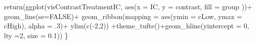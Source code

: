 \documentclass[
  10pt,
  dvipsnames,enabledeprecatedfontcommands]{scrartcl}
\newenvironment{Shaded}{\begin{snugshade}}{\end{snugshade}}
\newcommand{\AttributeTok}[1]{\textcolor[rgb]{0.77,0.63,0.00}{#1}}
\newcommand{\ConstantTok}[1]{\textcolor[rgb]{0.00,0.00,0.00}{#1}}
\newcommand{\DecValTok}[1]{\textcolor[rgb]{0.00,0.00,0.81}{#1}}
\newcommand{\FloatTok}[1]{\textcolor[rgb]{0.00,0.00,0.81}{#1}}
\newcommand{\FunctionTok}[1]{\textcolor[rgb]{0.00,0.00,0.00}{#1}}
\newcommand{\NormalTok}[1]{#1}
\newcommand{\SpecialCharTok}[1]{\textcolor[rgb]{0.00,0.00,0.00}{#1}}
\begin{document}
\begin{Shaded}
\begin{Highlighting}[]
  \FunctionTok{return}\NormalTok{(}\FunctionTok{ggplot}\NormalTok{(visContrastTreatmentIC, }\FunctionTok{aes}\NormalTok{(}\AttributeTok{x =}\NormalTok{ IC, }\AttributeTok{y =}\NormalTok{ contrast, }\AttributeTok{fill =}\NormalTok{ group ))}\SpecialCharTok{+}
           \FunctionTok{geom\_line}\NormalTok{(}\AttributeTok{se=}\ConstantTok{FALSE}\NormalTok{)}\SpecialCharTok{+}
    \FunctionTok{geom\_ribbon}\NormalTok{(}\AttributeTok{mapping =} \FunctionTok{aes}\NormalTok{(}\AttributeTok{ymin =}\NormalTok{ cLow, }\AttributeTok{ymax =}\NormalTok{ cHigh), }\AttributeTok{alpha =}\NormalTok{ .}\DecValTok{3}\NormalTok{)}\SpecialCharTok{+}
    \FunctionTok{ylim}\NormalTok{(}\FunctionTok{c}\NormalTok{(}\SpecialCharTok{{-}}\DecValTok{2}\NormalTok{,}\DecValTok{2}\NormalTok{)) }\SpecialCharTok{+}\FunctionTok{theme\_tufte}\NormalTok{()}\SpecialCharTok{+}\FunctionTok{geom\_hline}\NormalTok{(}\AttributeTok{yintercept =} \DecValTok{0}\NormalTok{, }\AttributeTok{lty =}\DecValTok{2}\NormalTok{, }\AttributeTok{size =} \FloatTok{0.1}\NormalTok{))}
\NormalTok{\}}



\end{Highlighting}
\end{Shaded}
\end{document}
